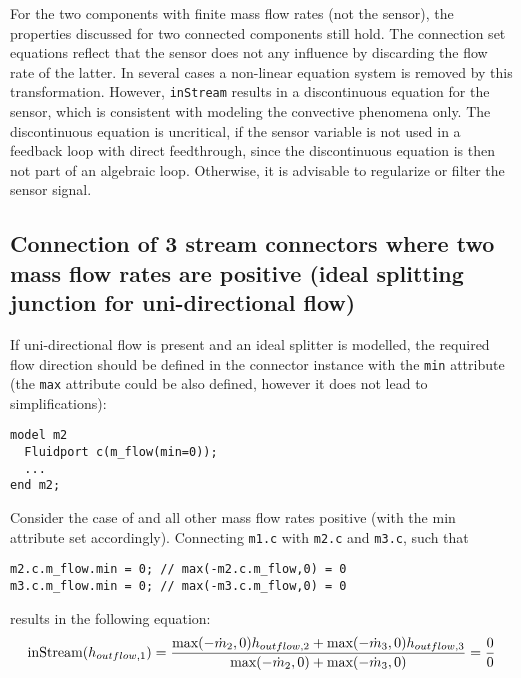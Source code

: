 For the two components with finite mass flow rates (not the sensor), the
properties discussed for two connected components still hold. The
connection set equations reflect that the sensor does not any influence
by discarding the flow rate of the latter. In several cases a non-linear
equation system is removed by this transformation. However, \lstinline!inStream!
results in a discontinuous equation for the sensor, which is consistent
with modeling the convective phenomena only. The discontinuous equation
is uncritical, if the sensor variable is not used in a feedback loop
with direct feedthrough, since the discontinuous equation is then not
part of an algebraic loop. Otherwise, it is advisable to regularize or
filter the sensor signal.

\subsection{Connection of 3 stream connectors where two mass flow rates are positive (ideal splitting junction for uni-directional flow)}\label{connection-of-3-stream-connectors-where-two-mass-flow-rates-are-positive-ideal-splitting-junction-for-uni-directional-flow}

If uni-directional flow is present and an ideal splitter is modelled,
the required flow direction should be defined in the connector instance
with the \lstinline!min! attribute (the \lstinline!max! attribute could be also defined,
however it does not lead to simplifications):
\begin{lstlisting}[language=modelica]
model m2
  Fluidport c(m_flow(min=0));
  ...
end m2;
\end{lstlisting}

Consider the case of and all other mass flow rates positive (with the
min attribute set accordingly). Connecting \lstinline!m1.c! with \lstinline!m2.c! and \lstinline!m3.c!, such
that
\begin{lstlisting}[language=modelica]
m2.c.m_flow.min = 0; // max(-m2.c.m_flow,0) = 0
m3.c.m_flow.min = 0; // max(-m3.c.m_flow,0) = 0
\end{lstlisting}
results in the following equation:
\begin{equation*}
\text{\lstinline!inStream!}(h_{outflow,1})=\frac{\text{max}(-\dot{m}_2,0)h_{outflow,2}+\text{max}(-\dot{m}_3,0)h_{outflow,3}}{\text{max}(-\dot{m}_2,0)+\text{max}(-\dot{m}_3,0)}=\frac{0}{0}
\end{equation*}

